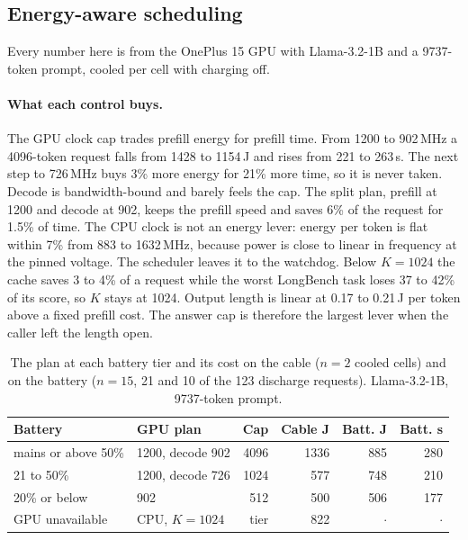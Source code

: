 \documentclass[sigconf, anonymous=false, screen=true]{acmart}
\newcommand{\no}{$\cdot$}
\begin{document}
\subsection{Energy-aware scheduling}
\label{sec:eval-energy}

Every number here is from the OnePlus 15 GPU with Llama-3.2-1B and a 9737-token prompt, cooled per cell with charging off.

\paragraph{What each control buys.} The GPU clock cap trades prefill energy for prefill time. From 1200 to 902\,MHz a 4096-token request falls from 1428 to 1154\,J and rises from 221 to 263\,s. The next step to 726\,MHz buys 3\% more energy for 21\% more time, so it is never taken. Decode is bandwidth-bound and barely feels the cap. The split plan, prefill at 1200 and decode at 902, keeps the prefill speed and saves 6\% of the request for 1.5\% of time. The CPU clock is not an energy lever: energy per token is flat within 7\% from 883 to 1632\,MHz, because power is close to linear in frequency at the pinned voltage. The scheduler leaves it to the watchdog. Below $K{=}1024$ the cache saves 3 to 4\% of a request while the worst LongBench task loses 37 to 42\% of its score, so $K$ stays at 1024. Output length is linear at 0.17 to 0.21\,J per token above a fixed prefill cost. The answer cap is therefore the largest lever when the caller left the length open.

\begin{table}[tb]
\caption{The plan at each battery tier and its cost on the cable ($n{=}2$ cooled cells) and on the battery ($n{=}15$, 21 and 10 of the 123 discharge requests). Llama-3.2-1B, 9737-token prompt.}
\label{tab:energy-aware}
\centering\footnotesize
\setlength{\tabcolsep}{3pt}
\begin{tabular}{l l r r r r}
\toprule
\textbf{Battery} & \textbf{GPU plan} & \textbf{Cap} & \textbf{Cable J} & \textbf{Batt. J} & \textbf{Batt. s} \\
\midrule
mains or above 50\% & 1200, decode 902 & 4096 & 1336 & 885 & 280 \\
21 to 50\%          & 1200, decode 726 & 1024 & 577  & 748 & 210 \\
20\% or below       & 902              & 512  & 500  & 506 & 177 \\
GPU unavailable     & CPU, $K{=}1024$  & tier & 822  & \no & \no \\
\bottomrule
\end{tabular}
\end{table}
\end{document}
